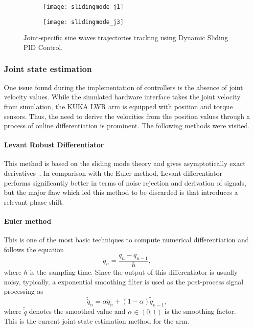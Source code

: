 \begin{figure}[H]
	\centering
	\begin{subfigure}[t]{0.9\textwidth}
		\centering
		\texttt{[image: slidingmode\_j1]}
	\end{subfigure}
	\begin{subfigure}[t]{0.9\textwidth}
		\centering
		\texttt{[image: slidingmode\_j3]}
	\end{subfigure}
	\caption{Joint-specific sine waves trajectories tracking using Dynamic Sliding PID Control.}
\end{figure}

\subsubsection{Joint state estimation}

One issue found during the implementation of controllers is the absence of joint velocity values. While the simulated hardware interface takes the joint velocity from simulation, the KUKA LWR arm is equipped with position and torque sensors. Thus, the need to derive the velocities from the position values through a process of online differentiation is prominent. The following methods were visited.

\paragraph{Levant Robust Differentiator}
This method is based on the sliding mode theory and gives asymptotically exact derivatives~\cite{levant06}. In comparison with the Euler method, Levant differentiator performs significantly better in terms of noise rejection and derivation of signals, but the major flaw which led this method to be discarded is that introduces a relevant phase shift.
\paragraph{Euler method}
This is one of the most basic techniques to compute numerical differentiation and follows the equation
\begin{equation}
\dot{q}_n = \frac{q_n - q_{n-1}}{h},
\end{equation}
where $h$ is the sampling time. Since the output of this differentiator is usually noisy, typically, a exponential smoothing filter is used as the post-process signal processing as
\begin{equation}
\tilde{\dot{q}}_n = \alpha\dot{q}_n + (1-\alpha)\tilde{\dot{q}}_{n-1},
\end{equation}
where $\tilde{\dot{q}}$ denotes the smoothed value and $\alpha\in(0,1)$ is the smoothing factor. This is the current joint state estimation method for the arm.

